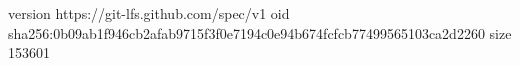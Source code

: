 version https://git-lfs.github.com/spec/v1
oid sha256:0b09ab1f946cb2afab9715f3f0e7194c0e94b674fcfcb77499565103ca2d2260
size 153601
